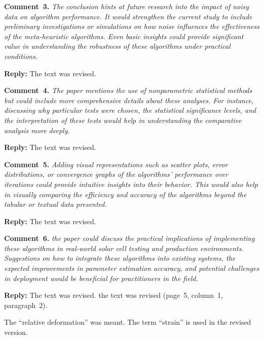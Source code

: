 \documentclass[a4paper,fleqn]{cas-sc}
\begin{document}
\vspace{1cm}
\noindent
\textcolor[rgb]{0.00,0.50,1.00}{\textbf{Comment~3.}}
\emph{The conclusion hints at future research into the impact of noisy data on algorithm performance.
It would strengthen the current study to include preliminary investigations or simulations on how noise influences the effectiveness of the meta-heuristic algorithms.
Even basic insights could provide significant value in understanding the robustness of these algorithms under practical conditions.}

\noindent
\textcolor[rgb]{0.51,0.00,0.00}{\textbf{Reply:}}
The text was revised.


\vspace{1cm}
\noindent
\textcolor[rgb]{0.00,0.50,1.00}{\textbf{Comment~4.}}
\emph{The paper mentions the use of nonparametric statistical methods but could include more comprehensive details about these analyses.
For instance, discussing why particular tests were chosen, the statistical significance levels,
 and the interpretation of these tests would help in understanding the comparative analysis more deeply.}

\noindent
\textcolor[rgb]{0.51,0.00,0.00}{\textbf{Reply:}}
The text was revised.


\vspace{1cm}
\noindent
\textcolor[rgb]{0.00,0.50,1.00}{\textbf{Comment~5.}}
\emph{ Adding visual representations such as scatter plots, error distributions,
or convergence graphs of the algorithms' performance over iterations could provide intuitive insights into their behavior.
This would also help in visually comparing the efficiency and accuracy of the algorithms beyond the tabular or textual data presented.}

\noindent
\textcolor[rgb]{0.51,0.00,0.00}{\textbf{Reply:}}
The text was revised.


\vspace{1cm}
\noindent
\textcolor[rgb]{0.00,0.50,1.00}{\textbf{Comment~6.}}
\emph{ the paper could discuss the practical implications of implementing these algorithms
in real-world solar cell testing and production environments.
Suggestions on how to integrate these algorithms into existing systems, the expected improvements
in parameter estimation accuracy, and potential challenges in deployment would be beneficial for practitioners in the field.}

\noindent
\textcolor[rgb]{0.51,0.00,0.00}{\textbf{Reply:}}
The text was revised.
the text was revised (page~5, column~1, paragraph~2).

The ``relative deformation'' was meant.
The term ``strain'' is used in the revised version.



%
\end{document}
